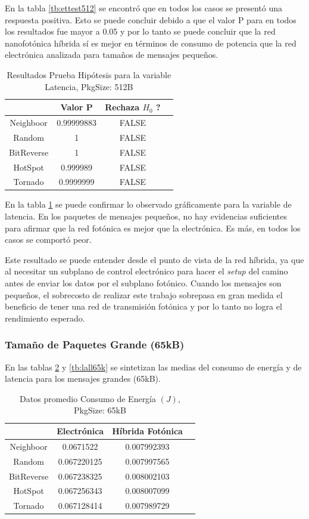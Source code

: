 En la tabla \ref{tb:ettest512} se encontró que en todos los casos se presentó una
respuesta positiva. Esto se puede concluir debido a que el valor P para
en todos los resultados fue mayor a 0.05 y por lo tanto se puede concluir que 
la red nanofotónica híbrida sí es mejor en términos de consumo de potencia
que la red electrónica analizada para tamaños de mensajes pequeños.


\begin{table}[H]
\centering
\begin{tabular}{|c|c|c|c|}
\hline
&Valor P&Rechaza $H_0$ ?\\
\hline
Neighboor&0.99999883&FALSE\\
Random&1&FALSE\\
BitReverse&1&FALSE\\
HotSpot&0.999989&FALSE\\
Tornado&0.9999999&FALSE\\
\hline
\end{tabular}
\caption{Resultados Prueba Hipótesis para la variable Latencia, PkgSize: 512B}
\label{tb:lttest512}
\end{table}

En la tabla \ref{tb:lttest512} se puede confirmar lo observado
gráficamente para la variable de 
latencia. En los paquetes de mensajes pequeños,
no hay evidencias suficientes para afirmar que la red fotónica
es mejor que la electrónica. Es más, en todos los casos se comportó peor.

Este resultado se puede entender desde el punto de vista de la red híbrida,
ya que al necesitar un subplano de control electrónico para hacer el \textit{setup} del
camino antes de enviar los datos por el subplano fotónico. Cuando los mensajes son
pequeños, el sobrecosto de realizar este trabajo sobrepasa en gran medida el 
beneficio de tener una red de transmisión fotónica \cite{shacham2008photonic} y por lo tanto no
logra el rendimiento esperado.

\subsubsection{Tamaño de Paquetes Grande (65kB)}

En las tablas \ref{tb:eall65k} y \ref{tb:lall65k} se sintetizan 
las medias del consumo de energía y de
latencia para los mensajes grandes (65kB).

\begin{table}[H]
\centering
\begin{tabular}{|c|c|c|c|}
\hline
&Electrónica&Híbrida Fotónica\\
\hline
Neighboor&0.0671522&0.007992393\\
Random&0.067220125&0.007997565\\
BitReverse&0.067238325&0.008002103\\
HotSpot&0.067256343&0.008007099\\
Tornado&0.067128414&0.007989729\\
\hline
\end{tabular}
\caption{Datos promedio Consumo de Energía $(J)$, PkgSize: 65kB}
\label{tb:eall65k}
\end{table}


